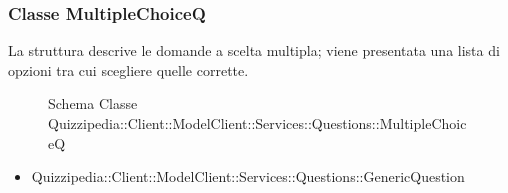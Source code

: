 \subsubsection{Classe MultipleChoiceQ}
La struttura descrive le domande a scelta multipla; viene presentata una lista di opzioni tra cui scegliere quelle corrette.
\begin{figure}[H]
\centering
\noindent{}
\caption[Schema Classe MultipleChoiceQ]{Schema Classe Quizzipedia::Client::ModelClient::Services::Questions::MultipleChoiceQ}
\end{figure}
\begin{itemize}
\item Quizzipedia::Client::ModelClient::Services::Questions::GenericQuestion
\end{itemize}
